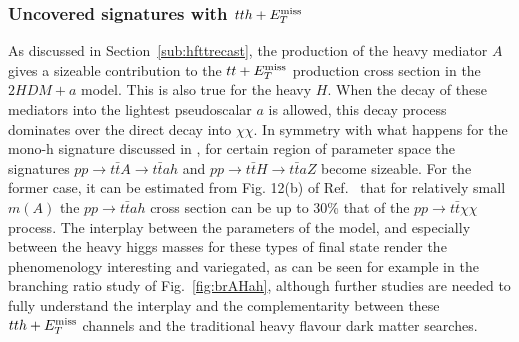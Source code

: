 \subsubsection{Uncovered signatures with $tt h+E_T^\mathrm{miss}$}

As discussed in Section~\ref{sub:hfttrecast}, the production of the
heavy mediator $A$ gives a sizeable contribution to the $tt+E_T^\mathrm{miss}$  
production cross section in the $2HDM+a$ model. This is also true for
the heavy $H$. When the decay of these mediators into the lightest
pseudoscalar $a$ is allowed, this decay process dominates over the
direct decay into $\chi\chi$. In symmetry with what happens for the
mono-h signature discussed in \cite{Bauer:2017ota}, for certain region
of parameter space the signatures $pp \rightarrow t\bar t A
\rightarrow t \bar t a h$ and $pp \rightarrow t\bar t H
\rightarrow t \bar t a Z$ become sizeable. For the former case, it can
be estimated from Fig. 12(b) of Ref.~\cite{Bauer:2017ota} that for
relatively small $m(A)$ the $pp \rightarrow t\bar t ah$ cross section
can be up to 30\% that of the $pp\rightarrow t \bar t \chi\chi$
process. The interplay between the parameters of the model, and
especially between the heavy higgs masses for these types of final
state render the phenomenology interesting and variegated, as can be
seen for example in the branching ratio study of Fig.~\ref{fig:brAHah}, although
further studies are needed to fully understand the interplay and the
complementarity between these $tth+E_T^\mathrm{miss}$ channels and the traditional
heavy flavour dark matter searches. 


